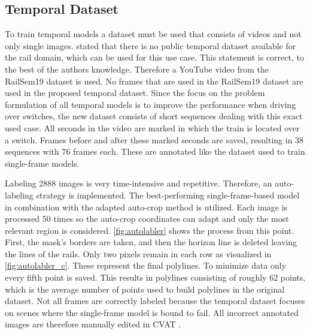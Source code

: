 \subsection{Temporal Dataset}
\label{sec:tempDataset}

To train temporal models a dataset must be used that consists of videos and not only single images.
\cite{tepNet2024} stated that there is no public temporal dataset available for the rail domain, which can be used for this use case.
This statement is correct, to the best of the authors knowledge.
Therefore a YouTube video \cite{temporalDataset_youtube_video} from the RailSem19 dataset is used.
No frames that are used in the RailSem19 dataset are used in the proposed temporal dataset.
Since the focus on the problem formulation of all temporal models is to improve the performance when driving over switches, the new dataset consists of short sequences dealing with this exact used case.
All seconds in the video \cite{temporalDataset_youtube_video} are marked in which the train is located over a switch.
Frames before and after these marked seconds are saved, resulting in 38 sequences with 76 frames each. These are annotated like the dataset used to train single-frame models.

Labeling 2888 images is very time-intensive and repetitive.
Therefore, an auto-labeling strategy is implemented.
The best-performing single-frame-based model in combination with the adapted auto-crop method is utilized.
Each image is processed 50 times so the auto-crop coordinates can adapt and only the most relevant region is considered.
\autoref{fig:autolabler} shows the process from this point.
First, the mask's borders are taken, and then the horizon line is deleted leaving the lines of the rails.
Only two pixels remain in each row as visualized in \autoref{fig:autolabler_c}.
These represent the final polylines. To minimize data only every fifth point is saved.
This results in polylines consisting of roughly 62 points, which is the average number of points used to build polylines in the original dataset.
Not all frames are correctly labeled because the temporal dataset focuses on scenes where the single-frame model is bound to fail.
All incorrect annotated images are therefore manually edited in CVAT \cite{cvat}.

